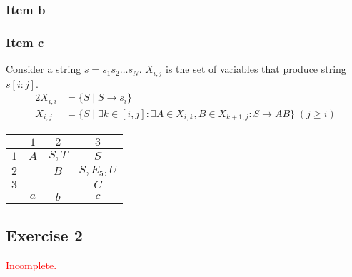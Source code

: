 \documentclass[docid=PA09]{tcom_PA}
\begin{document}
{\subsubsection{Item b}
\begin{center}
\end{center}
\subsubsection{Item c}
Consider a string $s=s_1s_2\ldots s_N$. $X_{i,j}$ is the set of variables that produce string $s[i:j]$.
\begin{alignat*}{2}
	X_{i,i} &= \{S\mid S \rightarrow s_i\}\\
	X_{i,j} &= \{S\mid \exists k \in [i,j] \colon \exists A\in X_{i,k},B\in X_{k+1,j}\colon S \rightarrow AB\}\;(j \geq i)
\end{alignat*}
\begin{center} \begin{tabular}{c || c | c | c}
	\backslashbox{$i$}{$j$} & $1             $ & $2             $ & $3      $ \\ \hline
	$1                    $ & $A             $ & $S, T          $ & $S      $ \\
    $2                    $ & \cellcolor{gray} & $B             $ & $S,E_5,U$ \\
	$3                    $ & \cellcolor{gray} & \cellcolor{gray} & $C      $ \\ \hline
	$                     $ & $a             $ & $b$     & $c$
\end{tabular} \end{center}
\subsection{Exercise 2}
\textcolor{red}{Incomplete.}
}
\end{document}
